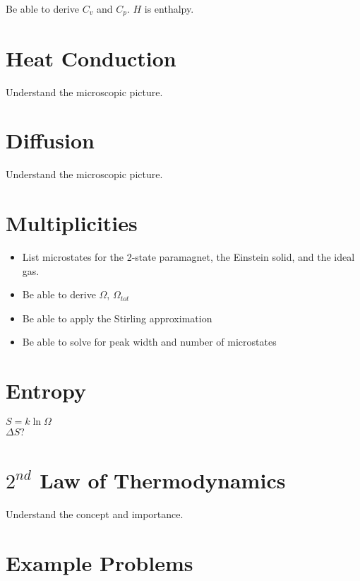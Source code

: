 \documentclass[a4paper, 11pt]{article}
\begin{document}
Be able to derive $C_v$ and $C_p$. $H$ is enthalpy.

\section{Heat Conduction}

Understand the microscopic picture.

\section{Diffusion}


Understand the microscopic picture.

\section{Multiplicities}

\begin{itemize}

\item List microstates for the 2-state paramagnet, the Einstein solid, and the ideal gas.

\item Be able to derive $\Omega$, $\Omega_{tot}$

\item Be able to apply the Stirling approximation

\item Be able to solve for peak width and number of microstates

\end{itemize}

\section{Entropy}

$S = k \ln{\Omega}$\\
$\Delta S$?

\section{$2^{nd}$ Law of Thermodynamics}

Understand the concept and importance.

\section{Example Problems}



%
\end{document}
